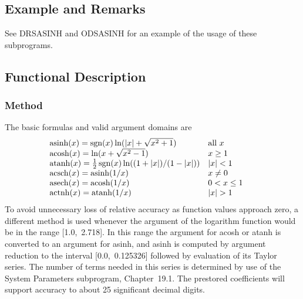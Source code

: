 \documentclass[twoside]{MATH77}
\begin{document}
\subsection{Example and Remarks}

See DRSASINH and ODSASINH for an example of the usage of these subprograms.

\subsection{Functional Description}

\subsubsection{Method}

The basic formulas and valid argument domains are
\begin{equation*}
\hspace{-15pt}\begin{array}{ll}
\asinh(x) = \sgn (x) \ln (|x| + \sqrt {x^2+1})& \text{all }x\\
\acosh(x) = \ln (x + \sqrt {x^2-1})& x \geq 1\\
\atanh(x) = \frac{1}{2} \sgn (x) \ln ((1+|x|)/(1-|x|))& |x| < 1\\
\acsch(x) = \asinh(1/x)& x \neq 0\\
\asech(x) = \acosh(1/x)& 0 < x \leq 1\\
\actnh(x) = \atanh(1/x)& |x| > 1
\end{array}
\end{equation*}
To avoid unnecessary loss of relative accuracy as function values approach
zero, a different method is used whenever the argument of the logarithm
function would be in the range [1.0,~2.718]. In this range the argument for
acosh or atanh is converted to an argument for asinh, and asinh is computed
by argument reduction to the interval [0.0,~0.125326] followed by evaluation
of its Taylor series. The number of terms needed in this series is
determined by use of the System Parameters subprogram, Chapter~19.1. The
prestored coefficients will support accuracy to about 25 significant decimal
digits.
\end{document}
